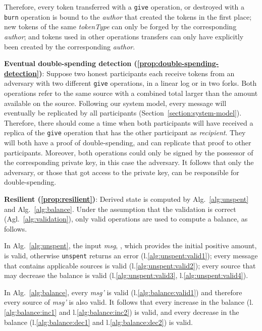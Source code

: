 \documentclass[sigplan,screen,10pt]{acmart}
\begin{document}
Therefore, every token transferred with a \texttt{give} operation, or destroyed with a \texttt{burn} operation is bound to the \textit{author} that created the tokens in the first place; new tokens of the same \textit{tokenType} can only be forged by the corresponding \textit{author}; and tokens used in other operations transfers can only have explicitly been created by the corresponding \textit{author}.

\textbf{Eventual double-spending detection (\ref{prop:double-spending-detection})}: Suppose two honest participants each receive tokens from an adversary with two different \texttt{give} operations, in a linear log or in two forks. Both operations refer to the same source with a combined total larger than the amount available on the source. Following our system model, every message will eventually be replicated by all participants (Section~\ref{section:system-model}). Therefore, there should come a time when both participants will have received a replica of the \texttt{give} operation that has the other participant as \textit{recipient}. They will both have a proof of double-spending, and can replicate that proof to other participants. Moreover, both operations could only be signed by the possessor of the corresponding private key, in this case the adversary. It follows that only the adversary, or those that got access to the private key, can be responsible for double-spending.

\textbf{Resilient (\ref{prop:resilient})}: Derived state is computed by Alg.~\ref{alg:unspent} and Alg.~\ref{alg:balance}. Under the assumption that the validation is correct (Agl.~\ref{alg:validation}), only valid operations are used to compute a balance, as follows.

In Alg.~\ref{alg:unspent}, the input \textit{msg}, , which provides the initial positive amount, is valid, otherwise \texttt{unspent} returns an error (l.\ref{alg:unspent:valid1});  every message that contains applicable sources is valid (l.\ref{alg:unspent:valid2}); every source that may decrease the balance is valid (l.\ref{alg:unspent:valid3}, l.\ref{alg:unspent:valid4}).

In Alg.~\ref{alg:balance}, every \textit{msg'} is valid (l.\ref{alg:balance:valid1}) and therefore every source of \textit{msg'} is also valid. It follows that every increase in the balance (l.\ref{alg:balance:inc1} and l.\ref{alg:balance:inc2}) is valid, and every decrease in the balance (l.\ref{alg:balance:dec1} and l.\ref{alg:balance:dec2}) is valid.
\end{document}
